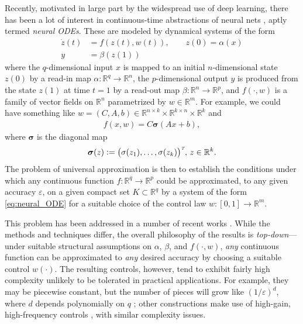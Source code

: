 \documentclass[letterpaper, 10pt, conference]{ieeeconf}
\def\Reals{{\mathbb R}}
\def\trn{{\hbox{\it\tiny T}}} %
\def\eps{\varepsilon}
\def\deq{:=}
\begin{document}
Recently, motivated in large part by the widespread use of deep learning, there has been a lot of interest in continuous-time abstractions of neural nets \cite{Hirsch89neural,Haber_2018,Weinan2017dynamical,chen2018neural}, aptly termed \textit{neural ODEs}. These are modeled by dynamical systems of the form\begin{subequations}\label{eq:neural_ODE}
	\begin{align}
	\dot{z}(t) &= f(z(t),w(t)), \qquad z(0) = \alpha(x)\\
	y &= \beta(z(1))
	\end{align}
\end{subequations}
where the $q$-dimensional input $x$ is mapped to an initial $n$-dimensional state $z(0)$ by a read-in map $\alpha : \Reals^q \to \Reals^n$, the $p$-dimensional output $y$ is produced from the state $z(1)$ at time $t=1$ by a read-out map $\beta : \Reals^n \to \Reals^p$, and $f(\cdot,w)$ is a family of vector fields on $\Reals^n$ parametrized by  $w \in \Reals^m$. For example, we could have something like $w = (C,A,b) \in \Reals^{n \times k} \times \Reals^{k \times n} \times \Reals^k$ and
\begin{align*}
	f(x,w) = C\boldsymbol{\sigma}(Ax + b),
\end{align*}
where $\boldsymbol{\sigma}$ is the diagonal map
\begin{align}\label{eq:diag_sigma}
	\boldsymbol{\sigma}(z) \deq \big(\sigma(z_1),\dots,\sigma(z_k)\big)^\trn, \, z \in \Reals^k.
\end{align}
The problem of universal approximation is then to establish the conditions under which any continuous function $f : \Reals^q \to \Reals^p$ could be approximated, to any given accuracy $\eps$, on a given compact set $K \subset \Reals^q$ by a system of the form \eqref{eq:neural_ODE} for a suitable choice of the control law $w : [0,1] \to \Reals^m$. 

This problem has been addressed in a number of recent works \cite{li2019deep,Ruiz-Balet:2021yj,tabuada2021universal,Agrachev2022}. While the methods and techniques differ, the overall philosophy of the results is \textit{top-down}---under suitable structural assumptions on $\alpha$, $\beta$, and $f(\cdot,w)$, \textit{any} continuous function can be approximated to \textit{any} desired accuracy by choosing a suitable control $w(\cdot)$. The resulting controls, however, tend to exhibit fairly high complexity unlikely to be tolerated in practical applications. For example, they may be piecewise constant, but the number of pieces will grow like $(1/\eps)^d$, where $d$ depends polynomially on $q$ \cite{li2019deep,Ruiz-Balet:2021yj,tabuada2021universal}; other constructions make use of high-gain, high-frequency controls \cite{Agrachev2022}, with similar complexity issues.
\end{document}
